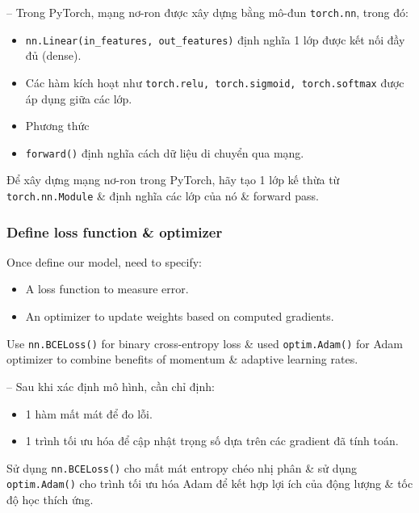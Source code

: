 \documentclass{article}
\begin{document}
-- Trong PyTorch, mạng nơ-ron được xây dựng bằng mô-đun {\tt torch.nn}, trong đó:
\begin{itemize}
    \item \verb|nn.Linear(in_features, out_features)| định nghĩa 1 lớp được kết nối đầy đủ (dense).
    \item Các hàm kích hoạt như {\tt torch.relu, torch.sigmoid, torch.softmax} được áp dụng giữa các lớp.
    \item Phương thức \item {\tt forward()} định nghĩa cách dữ liệu di chuyển qua mạng.
\end{itemize}
Để xây dựng mạng nơ-ron trong PyTorch, hãy tạo 1 lớp kế thừa từ {\tt torch.nn.Module} \& định nghĩa các lớp của nó \& forward pass.


\subsubsection{Define loss function \& optimizer}
Once define our model, need to specify:
\begin{itemize}
    \item A loss function to measure error.
    \item An optimizer to update weights based on computed gradients.
\end{itemize}
Use {\tt nn.BCELoss()} for binary cross-entropy loss \& used {\tt optim.Adam()} for Adam optimizer to combine benefits of momentum \& adaptive learning rates.

-- Sau khi xác định mô hình, cần chỉ định:
\begin{itemize}
    \item 1 hàm mất mát để đo lỗi.
    \item 1 trình tối ưu hóa để cập nhật trọng số dựa trên các gradient đã tính toán.
\end{itemize}
Sử dụng {\tt nn.BCELoss()} cho mất mát entropy chéo nhị phân \& sử dụng {\tt optim.Adam()} cho trình tối ưu hóa Adam để kết hợp lợi ích của động lượng \& tốc độ học thích ứng.

\end{document}

